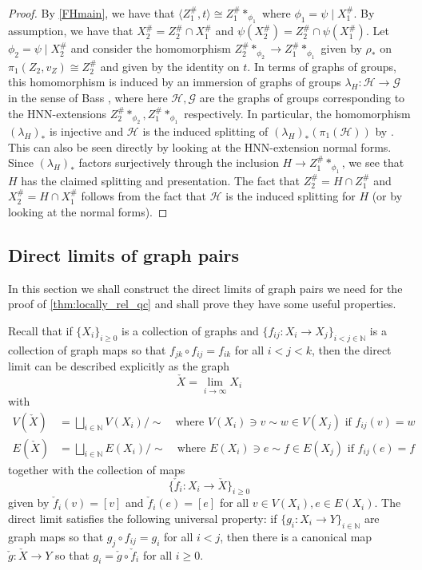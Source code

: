 \documentclass[11pt, a4paper]{amsart}
\theoremstyle{definition}
\newcommand{\isom}{\cong}
\newcommand{\N}{\mathbb{N}}
\begin{document}
\begin{proof}
By \cref{FHmain}, we have that $\langle Z_1^{\#}, t\rangle \isom Z_1^{\#}*_{\phi_1}$ where $\phi_1 = \psi\mid X_1^{\#}$. By assumption, we have that $X_2^{\#} = Z_2^{\#}\cap X_1^{\#}$ and $\psi(X_2^{\#}) = Z_2^{\#}\cap \psi(X_1^{\#})$. Let $\phi_2 = \psi\mid X_2^{\#}$ and consider the homomorphism $Z_2^{\#}*_{\phi_2} \to Z_1^{\#}*_{\phi_1}$ given by $\rho_*$ on $\pi_1(Z_2, v_Z)\cong Z_2^{\#}$ and given by the identity on $t$. In terms of graphs of groups, this homomorphism is induced by an immersion of graphs of groups $\lambda_H\colon\mathcal{H}\to \mathcal{G}$ in the sense of Bass \cite{Ba93}, where here $\mathcal{H}, \mathcal{G}$ are the graphs of groups corresponding to the HNN-extensions $Z_2^{\#}*_{\phi_2}, Z_1^{\#}*_{\phi_1}$ respectively. In particular, the homomorphism $(\lambda_H)_*$ is injective and $\mathcal{H}$ is the induced splitting of $(\lambda_H)_*(\pi_1(\mathcal{H}))$ by \cite[Proposition 2.7]{Ba93}. This can also be seen directly by looking at the HNN-extension normal forms. Since $(\lambda_H)_*$ factors surjectively through the inclusion $H\to Z_1^{\#}*_{\phi_1}$, we see that $H$ has the claimed splitting and presentation. The fact that $Z_2^{\#} = H\cap Z_1^{\#}$ and $X_2^{\#} = H\cap X_1^{\#}$ follows from the fact that $\mathcal{H}$ is the induced splitting for $H$ (or by looking at the normal forms).
\end{proof}



\subsection{Direct limits of graph pairs}
\label{sec:direct_limit}

In this section we shall construct the direct limits of graph pairs we need for the proof of \cref{thm:locally_rel_qc} and shall prove they have some useful properties.

Recall that if $\{X_i\}_{i\geqslant 0}$ is a collection of graphs and $\{f_{ij}\colon X_i\to X_{j}\}_{i< j\in \N}$ is a collection of graph maps so that $f_{jk}\circ f_{ij} = f_{ik}$ for all $i< j< k$, then the direct limit can be described explicitly as the graph
\[
\check{X} = \lim_{i\to\infty} X_i
\]
with
\begin{align*}
V(\check{X}) &= \bigsqcup_{i\in\N}V(X_i) /\sim \quad \text{where } V(X_i) \ni v\sim w\in V(X_j) \text{ if } f_{ij}(v) = w\\
E(\check{X}) &= \bigsqcup_{i\in\N}E(X_i) /\sim \quad \text{where } E(X_i) \ni e\sim f\in E(X_j) \text{ if } f_{ij}(e) = f
\end{align*}
together with the collection of maps
\[
\{\check{f}_i\colon X_i\to \check{X}\}_{i\geqslant 0}
\]
given by $\check{f}_i(v) = [v]$ and $\check{f}_i(e) = [e]$ for all $v\in V(X_i), e\in E(X_i)$. The direct limit satisfies the following universal property: if $\{g_i\colon X_i\to Y\}_{i\in\N}$ are graph maps so that $g_j\circ f_{ij} = g_i$ for all $i<j$, then there is a canonical map $\check{g}\colon \check{X}\to Y$ so that $g_i = \check{g}\circ\check{f}_i$ for all $i\geqslant 0$.
\end{document}

